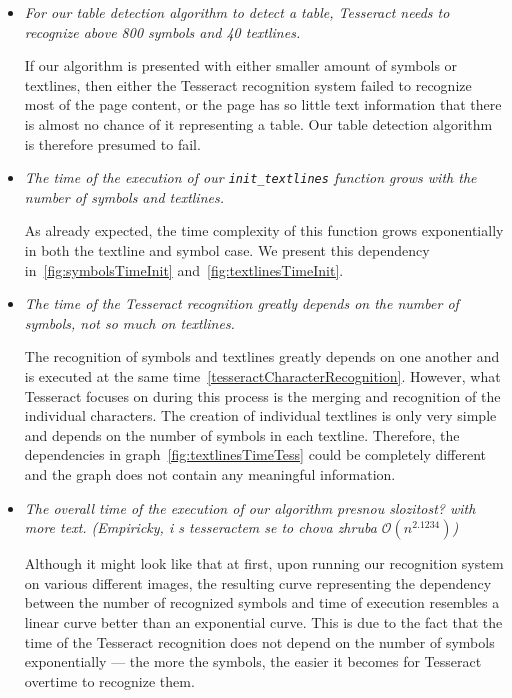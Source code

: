 \begin{itemize}
    \item \emph{For our table detection algorithm to detect a table, Tesseract needs to recognize above 800 symbols and 40 textlines.}
    
    If our algorithm is presented with either smaller amount of symbols or textlines, then either the Tesseract recognition system failed to recognize most of the page content, or the page has so little text information that there is almost no chance of it representing a table. Our table detection algorithm is therefore presumed to fail.

    \item \emph{The time of the execution of our \texttt{init\_textlines} function grows with the number of symbols and textlines.}
    
    As already expected, the time complexity of this function grows exponentially in both the textline and symbol case. We present this dependency in~\cref{fig:symbolsTimeInit} and~\cref{fig:textlinesTimeInit}.

    \item \emph{The time of the Tesseract recognition greatly depends on the number of symbols, not so much on textlines.}
    
    The recognition of symbols and textlines greatly depends on one another and is executed at the same time~\cref{tesseractCharacterRecognition}. However, what Tesseract focuses on during this process is the merging and recognition of the individual characters. The creation of individual textlines is only very simple and depends on the number of symbols in each textline. Therefore, the dependencies in graph~\cref{fig:textlinesTimeTess} could be completely different and the graph does not contain any meaningful information.
    
    \item \emph{The overall time of the execution of our algorithm  presnou slozitost? with more text. (Empiricky, i s tesseractem se to chova zhruba $\mathcal{O}(n^{2.1234})$)}
    
    Although it might look like that at first, upon running our recognition system on various different images, the resulting curve representing the dependency between the number of recognized symbols and time of execution resembles a linear curve better than an exponential curve. This is due to the fact that the time of the Tesseract recognition does not depend on the number of symbols exponentially --- the more the symbols, the easier it becomes for Tesseract overtime to recognize them.
    
\end{itemize}

